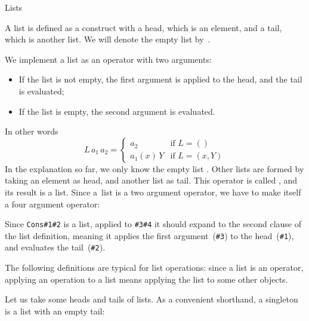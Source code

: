  {Lists}

A list is defined as a construct with a head, which is an element, and
a tail, which is another list. We will denote the empty list by~.
\begin{inputwithcode}
\let\Nil=\False
\end{inputwithcode}
We implement a list as an operator with two arguments:
\begin{itemize}
\item If the list is not empty, the first argument is applied to the
  head, and the tail is evaluated;
\item If the list is empty, the second argument is evaluated.
\end{itemize}
In other words
\[ L \, a_1 \, a_2 =
      \left\{\begin{array}{rl}a_2&\mbox{if $L=()$}\\
             a_1(x) \, Y&\mbox{if $L=(x,Y)$}
      \end{array}\right. \]
In the explanation so far, we only know the empty list . Other
lists are formed by taking an element as head, and another list as
tail. This operator is called , and its result is a
list. Since a~list is a two argument operator, we have to make
 itself a four argument operator:
\begin{inputwithcode}
\def\Cons#1#2#3#4{#3{#1}{#2}}
\end{inputwithcode}
Since \verb+Cons#1#2+ is a list, applied to \verb+#3#4+ it should
expand to the second clause of the list definition, meaning it applies
the first argument~(\verb+#3+) to the head~(\verb+#1+), and evaluates the
tail~(\verb+#2+).

The following definitions are typical for list operations: since a
list is an operator, applying an operation to a list means applying
the list to some other objects.
\begin{inputwithcode}
\def\Error{{ERROR}}
\def\Head#1{#1\First\Error}
\def\Tail#1{#1\Second\Error}
\end{inputwithcode}

Let us take some heads and tails of lists.
As a convenient shorthand, a singleton is a list with an empty tail:
\begin{inputwithcode}
\def\Singleton#1{\Cons{#1}\Nil}
\end{inputwithcode}
\begin{logix}
%
     {\Head{\Tail{\Cons\True{\Singleton\False}}}}
\end{logix}

